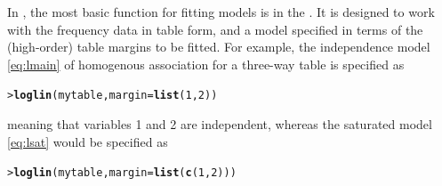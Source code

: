 \documentclass[10pt,krantz2]{krantz}\usepackage[]{graphicx}\usepackage[]{color}
\makeatletter
\newcommand{\hlnum}[1]{\textcolor[rgb]{0.686,0.059,0.569}{#1}}%
\newcommand{\hlstd}[1]{\textcolor[rgb]{0.345,0.345,0.345}{#1}}%
\newcommand{\hlkwc}[1]{\textcolor[rgb]{0.333,0.667,0.333}{#1}}%
\newcommand{\hlkwd}[1]{\textcolor[rgb]{0.737,0.353,0.396}{\textbf{#1}}}%
\newenvironment{kframe}{%
 \def\at@end@of@kframe{}%
 \ifinner\ifhmode%
  \def\at@end@of@kframe{\end{minipage}}%
  \begin{minipage}{\columnwidth}%
 \fi\fi%
 \def\FrameCommand##1{\hskip\@totalleftmargin \hskip-\fboxsep
 \colorbox{shadecolor}{##1}\hskip-\fboxsep
     \hskip-\linewidth \hskip-\@totalleftmargin \hskip\columnwidth}%
 \MakeFramed {\advance\hsize-\width
   \@totalleftmargin\z@ \linewidth\hsize
   \@setminipage}}%
 {\par\unskip\endMakeFramed%
 \at@end@of@kframe}
\newenvironment{knitrout}{}{} %
\renewenvironment{knitrout}{\small\renewcommand{\baselinestretch}{.85}}{} %
\makeatother
\begin{document}
In \R, the most basic function for fitting \loglin models is
 in the .
It is designed to work with the frequency data in table form,
and a model specified in terms of the (high-order) table margins
to be fitted. For example, the independence model \eqref{eq:lmain}
of homogenous association for a three-way table is specified
as
\begin{knitrout}
\color{fgcolor}\begin{kframe}
\begin{alltt}
\hlstd{> }\hlkwd{loglin}\hlstd{(mytable,} \hlkwc{margin} \hlstd{=} \hlkwd{list}\hlstd{(}\hlnum{1}\hlstd{,} \hlnum{2}\hlstd{))}
\end{alltt}
\end{kframe}
\end{knitrout}
meaning that variables 1 and 2 are independent, 
whereas the saturated model \eqref{eq:lsat} would be specified as
\begin{knitrout}
\color{fgcolor}\begin{kframe}
\begin{alltt}
\hlstd{> }\hlkwd{loglin}\hlstd{(mytable,} \hlkwc{margin} \hlstd{=} \hlkwd{list}\hlstd{(}\hlkwd{c}\hlstd{(}\hlnum{1}\hlstd{,} \hlnum{2}\hlstd{)))}
\end{alltt}
\end{kframe}
\end{knitrout}
\end{document}
